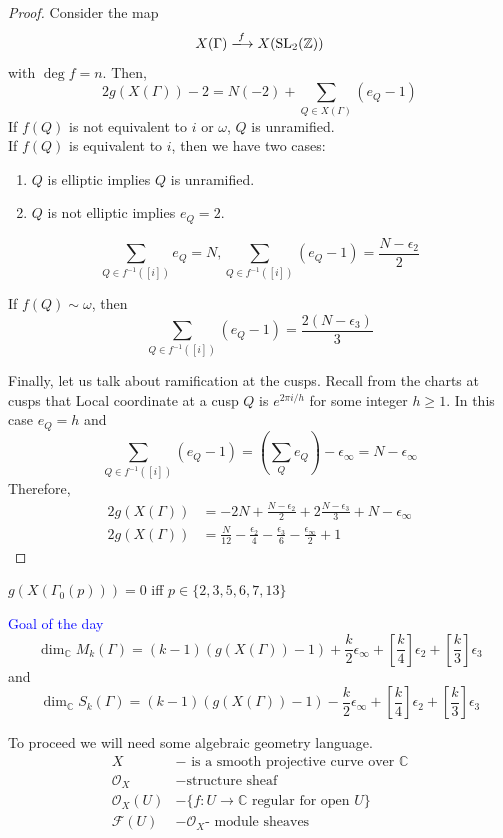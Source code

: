 \documentclass[oneside, 12pt]{scrbook}
\newcommand{\CC}{\mathbb C}
\newcommand{\ZZ}{\mathbb Z}
\newcommand{\SL}{\mathrm{SL}}
\theoremstyle{theorem}
\begin{document}
\begin{proof}
Consider the map $$X(\Gamma) \xlongrightarrow{f} X(\SL_{2}(\ZZ))$$ with $\deg f = n$. Then, $$2g(X(\Gamma)) -2 = N(-2) + \sum_{Q \in X(\Gamma)} (e_{Q}-1)$$
If $f(Q)$ is not equivalent to $i$ or $\omega$, $Q$ is unramified. \\

If $f(Q)$ is equivalent to $i$, then we have two cases: 
\begin{enumerate}
\item $Q$ is elliptic implies $Q$ is unramified.
\item $Q$ is not elliptic implies $e_{Q}=2$.
\end{enumerate}
$$\sum_{Q \in f^{-1}([i])} e_{Q}=N , \sum_{Q \in f^{-1}([i])} (e_{Q}-1) = \frac{N-\epsilon_{2}}{2}$$

If $f(Q) \sim \omega$, then $$\sum_{Q \in f^{-1}([i])} (e_{Q}-1) = \frac{2(N-\epsilon_{3})}{3}$$

Finally, let us talk about ramification at the cusps. Recall from the charts at cusps that Local coordinate at a cusp $Q$ is $e^{2\pi i /h}$ for some integer $h \geq 1$. In this case $e_{Q}=h$ and $$\sum_{Q \in f^{-1}([i])} (e_{Q}-1) = \left(\sum_{Q}e_{Q}\right) - \epsilon_{\infty} = N - \epsilon_{\infty}$$
Therefore, 
\begin{align*}
2g(X(\Gamma)) &= -2N + \frac{N - \epsilon_{2}}{2} + 2\frac{N-\epsilon_{3}}{3} + N -\epsilon_{\infty} \\
2g(X(\Gamma)) &= \frac{N}{12} - \frac{\epsilon_{2}}{4} - \frac{\epsilon_{3}}{6} - \frac{\epsilon_{\infty}}{2} + 1
\end{align*}
\end{proof}

\begin{exercise}
$g(X(\Gamma_{0}(p)))=0$ iff $p \in \{2,3,5,6,7,13\}$
\end{exercise}

\textcolor{Blue}{Goal of the day} $$\dim_{\CC} M_{k}(\Gamma) = (k-1)(g(X(\Gamma))-1) + \frac{k}{2} \epsilon_{\infty} + \left[\frac{k}{4} \right]\epsilon_{2} + \left[ \frac{k}{3} \right]\epsilon_{3}$$ and $$\dim_{\CC} S_{k}(\Gamma) = (k-1)(g(X(\Gamma))-1) - \frac{k}{2} \epsilon_{\infty} + \left[\frac{k}{4} \right]\epsilon_{2} + \left[ \frac{k}{3} \right]\epsilon_{3}$$

To proceed we will need some algebraic geometry language. 
\begin{align*}
X &- \text{ is a smooth projective curve over } \CC \\
\mathcal{O}_{X} &- \text{structure sheaf} \\
\mathcal{O}_{X}(U) &- \{f: U \rightarrow \CC \text{ regular for open } U\}\\
\mathcal{F}(U) &- \mathcal{O}_{X}\text{- module sheaves}
\end{align*}
\end{document}
